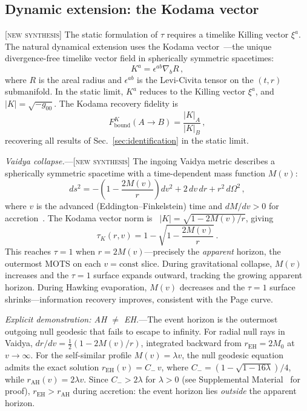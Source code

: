 \documentclass[prl,twocolumn,superscriptaddress,longbibliography,floatfix]{revtex4-2}
\newcommand{\tauasym}{\tau}
\newcommand{\Fbound}{F_{\mathrm{bound}}}
\begin{document}
\subsection{Dynamic extension: the Kodama vector}
\label{sec:kodama}

[\textsc{new synthesis}]
The static formulation of $\tauasym$ requires a
timelike Killing vector $\xi^{a}$.
The natural dynamical extension uses the Kodama
vector~\cite{Kodama1980}---the unique divergence-free
timelike vector field in spherically symmetric
spacetimes:
\begin{equation}
  K^{a} = \epsilon^{ab}\nabla_{b} R\,,
  \label{eq:kodama_def}
\end{equation}
where $R$ is the areal radius and $\epsilon^{ab}$ is the
Levi-Civita tensor on the $(t,r)$ submanifold.
In the static limit, $K^{a}$ reduces to the Killing vector
$\xi^{a}$, and $|K| = \sqrt{-g_{00}}$.
The Kodama recovery fidelity is
\begin{equation}
  \Fbound^{K}(A\!\to\! B) = \frac{|K|_{A}}{|K|_{B}}\,,
  \label{eq:FK}
\end{equation}
recovering all results of Sec.~\ref{sec:identification}
in the static limit.

\emph{Vaidya collapse.}---[\textsc{new synthesis}]
The ingoing Vaidya metric describes a spherically symmetric
spacetime with a time-dependent mass function $M(v)$:
\begin{equation}
  ds^{2} = -\!\left(1 - \frac{2M(v)}{r}\right)dv^{2}
  + 2\,dv\,dr + r^{2}\,d\Omega^{2}\,,
  \label{eq:vaidya_metric}
\end{equation}
where $v$ is the advanced (Eddington--Finkelstein) time
and $dM/dv > 0$ for accretion~\cite{Hiscock1981}.
The Kodama vector norm
is~\cite{Hayward1994,AbreuVisser2010}
$|K| = \sqrt{1 - 2M(v)/r}$, giving
\begin{equation}
  \tauasym_{K}(r,v) = 1 - \sqrt{1 - \frac{2M(v)}{r}}\,.
  \label{eq:tau_vaidya}
\end{equation}
This reaches $\tauasym = 1$ when $r = 2M(v)$---precisely
the \emph{apparent} horizon, the outermost MOTS on
each $v = \mathrm{const}$ slice.
During gravitational collapse, $M(v)$ increases and the
$\tauasym = 1$ surface expands outward, tracking the
growing apparent horizon.
During Hawking evaporation, $M(v)$ decreases and the
$\tauasym = 1$ surface shrinks---information recovery
improves, consistent with the Page curve.

\emph{Explicit demonstration: AH $\neq$ EH.}---The
event horizon is the outermost outgoing null geodesic that
fails to escape to infinity.
For radial null rays in Vaidya,
$dr/dv = \frac{1}{2}(1 - 2M(v)/r)$, integrated backward
from $r_{\text{EH}} = 2M_0$ at $v \to \infty$.
For the self-similar profile $M(v) = \lambda v$, the null
geodesic equation admits the exact solution
$r_{\text{EH}}(v) = C_{-}\,v$, where
$C_{-} = (1 - \sqrt{1 - 16\lambda})/4$, while
$r_{\text{AH}}(v) = 2\lambda v$.
Since $C_{-} > 2\lambda$ for $\lambda > 0$
(see Supplemental Material~\cite{supplement} for proof),
$r_{\text{EH}} > r_{\text{AH}}$ during accretion:
the event horizon lies \emph{outside} the apparent horizon.
\end{document}
